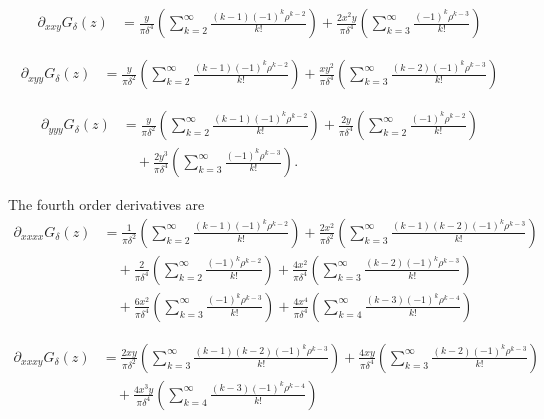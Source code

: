 \documentclass[12pt]{amsart}
\begin{document}
\begin{align*}
	\partial_{xxy} G_\delta(z) &= \frac{y}{\pi \delta^4} \left( \sum_{k=2}^\infty \frac{ (k-1) (-1)^k \rho^{k-2} }{ k!} \right) + \frac{2x^2y}{\pi \delta^4} \left( \sum_{k=3}^\infty \frac{  (-1)^k \rho^{k-3} }{ k!} \right)
\end{align*}

\begin{align*}
	\partial_{xyy}G_\delta(z) &=  \frac{y}{\pi \delta^2} \left( \sum_{k=2}^\infty \frac{  (k-1)(-1)^k \rho^{k-2} }{ k!} \right) +  \frac{x y^2}{\pi \delta^4} \left( \sum_{k=3}^\infty \frac{  (k-2) (-1)^k \rho^{k-3} }{ k!} \right)
\end{align*}

\begin{align*}
	\partial_{yyy} G_\delta(z) &= \frac{y}{\pi \delta^2} \left( \sum_{k=2}^\infty \frac{ (k-1) (-1)^k \rho^{k-2} }{ k!} \right) +  \frac{2y}{\pi \delta^4} \left( \sum_{k=2}^\infty \frac{  (-1)^k \rho^{k-2} }{ k!} \right)\\
		&\quad + \frac{2y^3}{\pi \delta^4} \left( \sum_{k=3}^\infty \frac{  (-1)^k \rho^{k-3} }{ k!} \right).
\end{align*}

The fourth order derivatives are
\begin{align*}
	\partial_{xxxx}G_\delta(z) &= \frac{1}{\pi \delta^2} \left( \sum_{k=2}^\infty \frac{ (k-1) (-1)^k \rho^{k-2} }{ k!} \right) 
		+ \frac{2x^2}{\pi \delta^2} \left( \sum_{k=3}^\infty \frac{ (k-1) (k-2) (-1)^k \rho^{k-3} }{ k!} \right) \\
&\quad	+  \frac{2}{\pi \delta^4} \left( \sum_{k=2}^\infty \frac{  (-1)^k \rho^{k-2} }{ k!} \right)
		+  \frac{4x^2}{\pi \delta^4} \left( \sum_{k=3}^\infty \frac{  (k-2) (-1)^k \rho^{k-3} }{ k!} \right) \\
&\quad	+ \frac{6x^2}{\pi \delta^4} \left( \sum_{k=3}^\infty \frac{  (-1)^k \rho^{k-3} }{ k!} \right) 
		+ \frac{4x^4}{\pi \delta^4} \left( \sum_{k=4}^\infty \frac{  (k-3) (-1)^k \rho^{k-4} }{ k!} \right) 
\end{align*}

\begin{align*}
	\partial_{xxxy} G_\delta(z) &= \frac{2xy}{\pi \delta^2} \left( \sum_{k=3}^\infty \frac{ (k-1)(k-2) (-1)^k \rho^{k-3} }{ k!} \right) +  \frac{4xy}{\pi \delta^4} \left( \sum_{k=3}^\infty \frac{  (k-2) (-1)^k \rho^{k-3} }{ k!} \right)\\
		&\quad + \frac{4 x^3y}{\pi \delta^4} \left( \sum_{k=4}^\infty \frac{  (k-3) (-1)^k \rho^{k-4} }{ k!} \right)
\end{align*}
\end{document}
